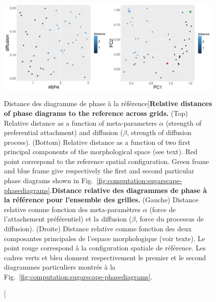 
\begin{figure}
\includegraphics[width=\linewidth]{Figures/Final/3-1-3-fig-computation-sugarscape-distance.jpg}
\caption[Relative distances of phase diagrams to the reference][Distance des diagramme de phase à la référence]{\textbf{Relative distances of phase diagrams to the reference across grids.} (Top) Relative distance as a function of meta-parameters $\alpha$ (strength of preferential attachment) and diffusion ($\beta$, strength of diffusion process). (Bottom) Relative distance as a function of two first principal components of the morphological space (see text). Red point correspond to the reference spatial configuration. Green frame and blue frame give respectively the first and second particular phase diagrams shown in Fig.~\ref{fig:computation:sugarscape-phasediagrams}.\label{fig:computation:sugarscape-distance}}{\textbf{Distance relative des diagrammes de phase à la référence pour l'ensemble des grilles.} (Gauche) Distance relative comme fonction des meta-paramètres $\alpha$ (force de l'attachement préférentiel) et la diffusion ($\beta$, force du processus de diffusion). (Droite) Distance relative comme fonction des deux composantes principales de l'espace morphologique (voir texte). Le point rouge correspond à la configuration spatiale de référence. Les cadres verts et bleu donnent respectivement le premier et le second diagrammes particuliers montrés à la Fig.~\ref{fig:computation:sugarscape-phasediagrams}.\label{fig:computation:sugarscape-distance}}
\end{figure}



